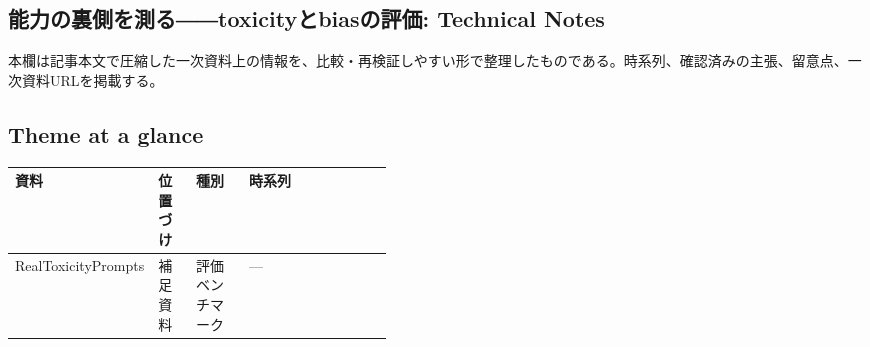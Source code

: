 \subsection*{能力の裏側を測る――toxicityとbiasの評価: Technical Notes}
本欄は記事本文で圧縮した一次資料上の情報を、比較・再検証しやすい形で整理したものである。時系列、確認済みの主張、留意点、一次資料URLを掲載する。
\smallskip
{}\par
\medskip
\subsection*{Theme at a glance}
\begin{center}
\footnotesize
\begin{tabularx}{\linewidth}{@{}p{0.20\linewidth}p{0.10\linewidth}p{0.14\linewidth}X@{}}
\toprule
資料 & 位置づけ & 種別 & 時系列 \\
\midrule
RealToxicityPrompts & 補足資料 & 評価ベンチマーク & — \\
\bottomrule
\end{tabularx}
\end{center}
\normalsize

